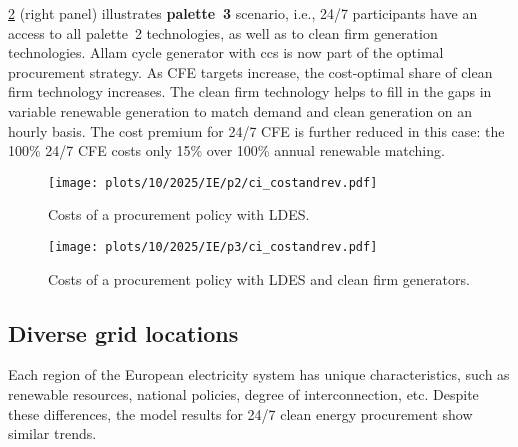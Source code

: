 \cref{fig:10-2025-IE-p3-ci_costandrev} (right panel) illustrates \textbf{palette~3} scenario, i.e., 24/7 participants have an access to all palette~2 technologies, as well as to clean firm generation technologies.
Allam cycle generator with \gls{ccs} is now part of the optimal procurement strategy.
As CFE targets increase, the cost-optimal share of clean firm technology increases.
The clean firm technology helps to fill in the gaps in variable renewable generation to match demand and clean generation on an hourly basis.
The cost premium for 24/7 CFE is further reduced in this case: the 100\% 24/7 CFE costs only 15\% over 100\% annual renewable matching.

\begin{figure*}
    \centering
    \begin{subfigure}{0.5\textwidth}
        \centering
        \caption{Costs of a procurement policy with LDES.}
        \texttt{[image: plots/10/2025/IE/p2/ci\_costandrev.pdf]}
        \label{fig:10-2025-IE-p2-ci_costandrev}
    \end{subfigure}%
    \begin{subfigure}{0.5\textwidth}
        \centering
        \caption{Costs of a procurement policy with LDES and clean firm generators.}
        \texttt{[image: plots/10/2025/IE/p3/ci\_costandrev.pdf]}
        \label{fig:10-2025-IE-p3-ci_costandrev}
    \end{subfigure}
    \caption{The breakdown of costs per procurement policy if \gls{ci} consumers located in Ireland have an access to a wider palette of technologies:
    w/ \gls{ldes} (\cref{fig:10-2025-IE-p2-ci_costandrev});
    w/ \gls{ldes} and clean firm generation technologies (\cref{fig:10-2025-IE-p3-ci_costandrev}).
    }
    \label{fig:10-2025-IE-p23-ci_procurement}
\end{figure*}


\subsection{Diverse grid locations}
\label{subsec:location}

\vspace{10pt}
\begin{res}
    Each region of the European electricity system has unique characteristics, such as renewable resources, national policies, degree of interconnection, etc.
    Despite these differences, the model results for 24/7 clean energy procurement show similar trends. 
\end{res}

